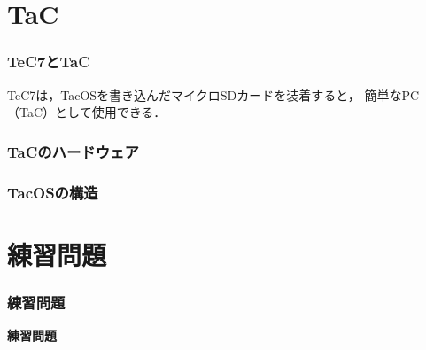 \documentclass[handout]{beamer}                   %
\begin{document}
\section{TaC}
\begin{frame}
  \frametitle{TeC7とTaC}
  \begin{minipage}{0.58\columnwidth}
  \end{minipage}
  \begin{minipage}{0.38\columnwidth}
  \end{minipage}
\vfill
TeC7は，TacOSを書き込んだマイクロSDカードを装着すると，
簡単なPC（TaC）として使用できる．
\end{frame}

\begin{frame}
  \frametitle{TaCのハードウェア}
\end{frame}

\begin{frame}
  \frametitle{TacOSの構造}
\end{frame}

\section{練習問題}
\begin{frame}
  \frametitle{練習問題}
  \vfill
  \begin{center}
    \textbf{\Huge 練習問題}
  \end{center}
  \vfill
\end{frame}
\end{document}
